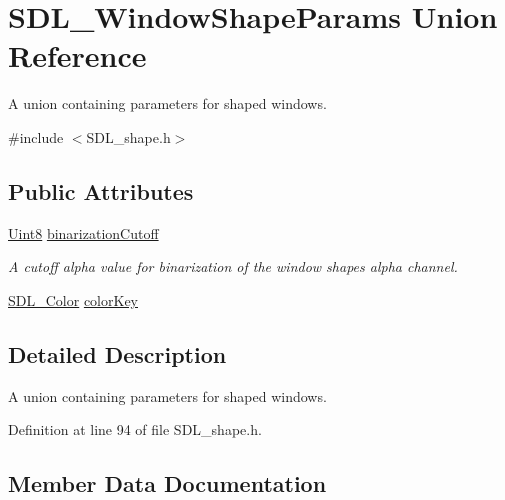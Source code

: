 \hypertarget{union_s_d_l___window_shape_params}{}\section{S\+D\+L\+\_\+\+Window\+Shape\+Params Union Reference}
\label{union_s_d_l___window_shape_params}


A union containing parameters for shaped windows.  




{\ttfamily \#include $<$S\+D\+L\+\_\+shape.\+h$>$}

\subsection*{Public Attributes}
\begin{DoxyCompactItemize}
\item 
\mbox{\hyperlink{_s_d_l__stdinc_8h_a2944638813a090aa23e62f4da842c3e2}{Uint8}} \mbox{\hyperlink{union_s_d_l___window_shape_params_a534c40b09588a8075c0a70227753dc56}{binarization\+Cutoff}}
\begin{DoxyCompactList}\small\item\em A cutoff alpha value for binarization of the window shape\textquotesingle{}s alpha channel. \end{DoxyCompactList}\item 
\mbox{\hyperlink{struct_s_d_l___color}{S\+D\+L\+\_\+\+Color}} \mbox{\hyperlink{union_s_d_l___window_shape_params_a8bf3e442a51a1bbf452cfec7c1ed5318}{color\+Key}}
\end{DoxyCompactItemize}


\subsection{Detailed Description}
A union containing parameters for shaped windows. 

Definition at line 94 of file S\+D\+L\+\_\+shape.\+h.



\subsection{Member Data Documentation}
\mbox{\label{union_s_d_l___window_shape_params_a534c40b09588a8075c0a70227753dc56}} 

